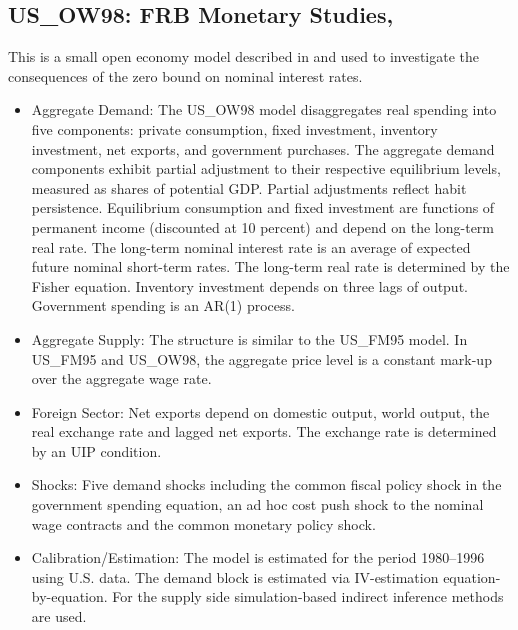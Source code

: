 \documentclass[11pt,a4paper]{article}
\begin{document}
	\subsection{US\_OW98: FRB Monetary Studies, \cite{OrphanidesWieland1998}}
	\label{USOW98}
	This is a small open economy model described in \cite{OrphanidesWieland1998} and used to
	investigate the consequences of the zero bound on nominal interest rates.
	\begin{itemize}
		\item Aggregate Demand: The US\_OW98 model disaggregates real spending into five components: private consumption, fixed
		investment, inventory investment, net exports, and government purchases. The aggregate demand
		components exhibit partial adjustment to their respective equilibrium levels, measured as shares of
		potential GDP. Partial adjustments reflect habit persistence. Equilibrium consumption and fixed investment are functions of permanent income (discounted at 10 percent) and depend on the long-term real rate. The long-term nominal interest rate is an average of expected future nominal short-term rates. The long-term real rate is determined by the Fisher equation. Inventory investment depends on three lags of output. Government spending is an AR(1) process.
		\item Aggregate Supply: The structure is similar to the US\_FM95 model.
		In US\_FM95 and US\_OW98, the aggregate price level is a constant mark-up over the aggregate wage rate.
		\item Foreign Sector: Net exports depend on domestic output, world output, the real exchange rate and lagged net exports. The exchange rate is determined by an UIP condition.
		\item Shocks: Five demand shocks including the common fiscal policy shock in the government spending equation, an ad hoc cost push shock to the nominal wage contracts and the common monetary policy shock.
		\item Calibration/Estimation: The model is estimated for the period 1980--1996 using U.S. data. The demand block is estimated via IV-estimation equation-by-equation. For the supply side simulation-based indirect inference methods are used.

\end{itemize}
\end{document}
